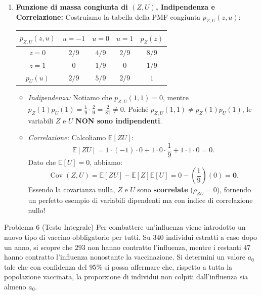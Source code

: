 \documentclass[11pt,a4paper]{article}
\newcommand{\EE}{\mathbb{E}}
\newcommand{\Cov}{\operatorname{Cov}}
\begin{document}
\begin{soluzionebox}
\begin{enumerate}[label=(\roman*)]
    \item \textbf{Funzione di massa congiunta di $(Z, U)$, Indipendenza e Correlazione:}
    Costruiamo la tabella della PMF congiunta $p_{Z,U}(z, u)$:
    \begin{center}
    \begin{tabular}{c|ccc|c}
    \toprule
    $p_{Z,U}(z, u)$ & $u = -1$ & $u = 0$ & $u = 1$ & $p_Z(z)$ \\
    \midrule
    $z = 0$ & $2/9$ & $4/9$ & $2/9$ & $8/9$ \\
    $z = 1$ & $0$ & $1/9$ & $0$ & $1/9$ \\
    \midrule
    $p_U(u)$ & $2/9$ & $5/9$ & $2/9$ & $1$ \\
    \bottomrule
    \end{tabular}
    \end{center}
    \begin{itemize}
        \item \emph{Indipendenza:} Notiamo che $p_{Z,U}(1, 1) = 0$, mentre $p_Z(1) p_U(1) = \frac{1}{9} \cdot \frac{2}{9} = \frac{2}{81} \neq 0$.
        Poiché $p_{Z,U}(1,1) \neq p_Z(1)p_U(1)$, le variabili $Z$ e $U$ \textbf{NON sono indipendenti}.
        \item \emph{Correlazione:} Calcoliamo $\EE[ZU]$:
        \[
        \EE[ZU] = 1 \cdot (-1) \cdot 0 + 1 \cdot 0 \cdot \frac{1}{9} + 1 \cdot 1 \cdot 0 = 0.
        \]
        Dato che $\EE[U] = 0$, abbiamo:
        \[
        \Cov(Z, U) = \EE[ZU] - \EE[Z]\EE[U] = 0 - \left(\frac{1}{9}\right)(0) = \bm{0}.
        \]
        Essendo la covarianza nulla, $Z$ e $U$ sono \textbf{scorrelate} ($\rho_{ZU}=0$), fornendo un perfetto esempio di variabili dipendenti ma con indice di correlazione nullo!
    \end{itemize}
\end{enumerate}
\end{soluzionebox}

\begin{problemabox}{Problema 6 (Testo Integrale)}
Per combattere un'influenza viene introdotto un nuovo tipo di vaccino obbligatorio per tutti. Su $340$ individui estratti a caso dopo un anno, si scopre che $293$ non hanno contratto l'influenza, mentre i restanti $47$ hanno contratto l'influenza nonostante la vaccinazione. Si determini un valore $a_0$ tale che con confidenza del $95\%$ si possa affermare che, rispetto a tutta la popolazione vaccinata, la proporzione di individui non colpiti dall'influenza sia almeno $a_0$.
\end{problemabox}
\end{document}
